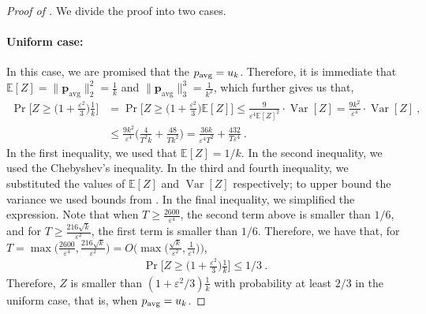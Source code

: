 \documentclass[10pt]{article} %
\def\eps{{\varepsilon}}
\newcommand{\E}{\mathbb{E}}
\theoremstyle{plain}
\newcommand{\bp}{\textbf{p}}
\newcommand{\avg}{\mathrm{avg}}
\newcommand{\Var}{\operatorname{{Var}}}
\begin{document}
\begin{proof}[Proof of ]
	We divide the proof into two cases. 
	\paragraph{Uniform case:} In this case, we are promised that the $\bp_{\avg}=\uni_{k}$. Therefore, it is immediate that $\E[Z] = \|\bp_{\avg}\|_2^2 = \frac{1}{k}$ and $\|\bp_{\avg}\|_3^3 = \frac{1}{k^2}$, which further gives us that,
	\begin{align*}
		\Pr\Big[Z \ge \Big(1+\frac{\eps^2}{3}\Big)\frac{1}{k}\Big] &= \Pr\Big[Z \ge \Big(1+\frac{\eps^2}{3}\Big)\E[Z]\Big]
		\le \frac{9}{\eps^4\E[Z]^2} \cdot \Var[Z] = \frac{9k^2}{\eps^4} \cdot \Var[Z] ~,\\ 
		&\le \frac{9k^2}{\eps^4} \Big(\frac{4}{T^2k} + \frac{48}{Tk^2}\Big)
		= \frac{36k}{\eps^4T^2} + \frac{432}{T\eps^4}~.
	\end{align*}
	In the first inequality, we used that $\E[Z]=1/k$. In the second inequality, we used the Chebyshev's inequality.  In the third and fourth inequality, we substituted the values of $\E[Z]$ and $\Var[Z]$ respectively; to upper bound the variance we used bounds from . In the final inequality, we simplified the expression. 
	Note that when $T \ge \frac{2600}{\eps^4}$, the second term above is smaller than $1/6$, and for $T \ge \frac{216\sqrt{k}}{\eps^2}$, the first term is smaller than $1/6$. Therefore, we have that, for $T = \max\Big( \frac{2600}{\eps^4}, \frac{216\sqrt{k}}{\eps^2}\Big) = O\Big(\max\Big(\frac{\sqrt{k}}{\eps^2},\frac{1}{\eps^4}\Big)\Big)$,
	\begin{align*}
		\Pr\Big[Z \ge \Big(1+\frac{\eps^2}{3}\Big)\frac{1}{k}\Big] \leq 1/3~.
	\end{align*}
	Therefore, $Z$ is smaller than $(1+\eps^2/3)\frac{1}{k}$ with probability at least $2/3$ in the uniform case, that is, when $\bp_{\avg}=\uni_{k}$.
	

\end{proof}
\end{document}
